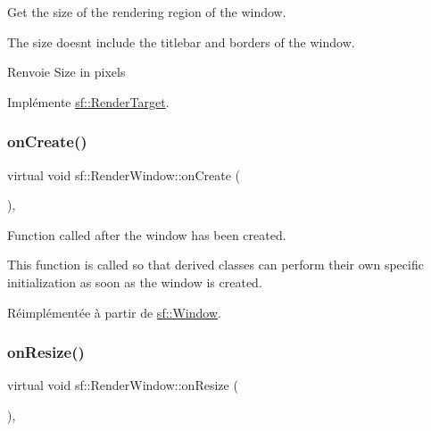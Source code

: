 Get the size of the rendering region of the window. 

The size doesn\textquotesingle{}t include the titlebar and borders of the window.

\begin{DoxyReturn}{Renvoie}
Size in pixels 
\end{DoxyReturn}


Implémente \hyperlink{classsf_1_1RenderTarget_a2e5ade2457d9fb4c4907ae5b3d9e94a5}{sf\+::\+Render\+Target}.

\mbox{\label{classsf_1_1RenderWindow_a5bef0040b0fa87bed9fbd459c980d53a}} 
\subsubsection{\texorpdfstring{on\+Create()}{onCreate()}}
{\footnotesize\ttfamily virtual void sf\+::\+Render\+Window\+::on\+Create (\begin{DoxyParamCaption}{ }\end{DoxyParamCaption})\hspace{0.3cm}{\ttfamily [protected]}, {\ttfamily [virtual]}}



Function called after the window has been created. 

This function is called so that derived classes can perform their own specific initialization as soon as the window is created. 

Réimplémentée à partir de \hyperlink{classsf_1_1Window_a106633b9be49b27f83d4712689b493eb}{sf\+::\+Window}.

\mbox{\label{classsf_1_1RenderWindow_a5c85fe482313562d33ffd24a194b6fef}} 
\subsubsection{\texorpdfstring{on\+Resize()}{onResize()}}
{\footnotesize\ttfamily virtual void sf\+::\+Render\+Window\+::on\+Resize (\begin{DoxyParamCaption}{ }\end{DoxyParamCaption})\hspace{0.3cm}{\ttfamily [protected]}, {\ttfamily [virtual]}}



